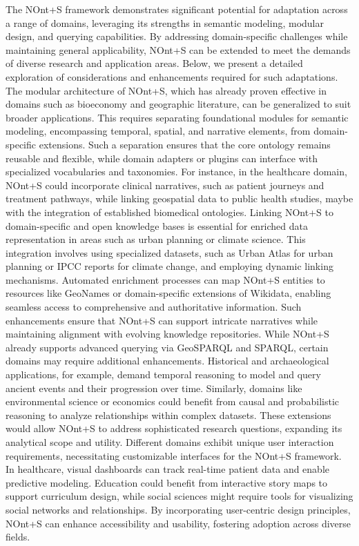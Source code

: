 The NOnt+S framework demonstrates significant potential for adaptation across a range of domains, leveraging its strengths in semantic modeling, modular design, and querying capabilities. By addressing domain-specific challenges while maintaining general applicability, NOnt+S can be extended to meet the demands of diverse research and application areas. Below, we present a detailed exploration of considerations and enhancements required for such adaptations.
The modular architecture of NOnt+S, which has already proven effective in domains such as bioeconomy and geographic literature, can be generalized to suit broader applications. This requires separating foundational modules for semantic modeling, encompassing temporal, spatial, and narrative elements, from domain-specific extensions. Such a separation ensures that the core ontology remains reusable and flexible, while domain adapters or plugins can interface with specialized vocabularies and taxonomies. For instance, in the healthcare domain, NOnt+S could incorporate clinical narratives, such as patient journeys and treatment pathways, while linking geospatial data to public health studies, maybe with the integration of established biomedical ontologies.
Linking NOnt+S to domain-specific and open knowledge bases is essential for enriched data representation in areas such as urban planning or climate science. This integration involves using specialized datasets, such as Urban Atlas for urban planning or IPCC reports for climate change, and employing dynamic linking mechanisms. Automated enrichment processes can map NOnt+S entities to resources like GeoNames or domain-specific extensions of Wikidata, enabling seamless access to comprehensive and authoritative information. Such enhancements ensure that NOnt+S can support intricate narratives while maintaining alignment with evolving knowledge repositories.
While NOnt+S already supports advanced querying via GeoSPARQL and SPARQL, certain domains may require additional enhancements. Historical and archaeological applications, for example, demand temporal reasoning to model and query ancient events and their progression over time. Similarly, domains like environmental science or economics could benefit from causal and probabilistic reasoning to analyze relationships within complex datasets. These extensions would allow NOnt+S to address sophisticated research questions, expanding its analytical scope and utility.
Different domains exhibit unique user interaction requirements, necessitating customizable interfaces for the NOnt+S framework. In healthcare, visual dashboards can track real-time patient data and enable predictive modeling. Education could benefit from interactive story maps to support curriculum design, while social sciences might require tools for visualizing social networks and relationships. By incorporating user-centric design principles, NOnt+S can enhance accessibility and usability, fostering adoption across diverse fields.
